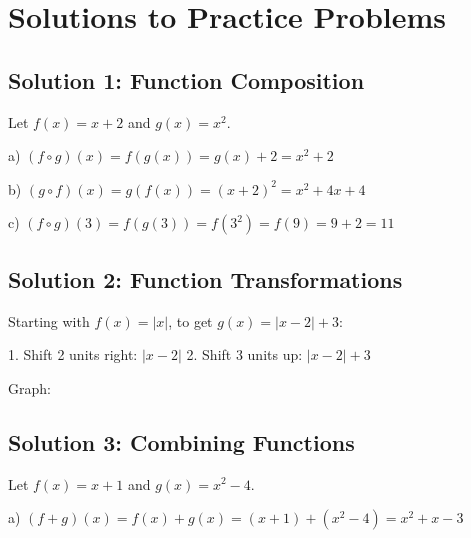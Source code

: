 \documentclass[12pt]{article}
\begin{document}
\newpage

\section{Solutions to Practice Problems}

\subsection{Solution 1: Function Composition}

Let $f(x) = x + 2$ and $g(x) = x^2$.

a) $(f \circ g)(x) = f(g(x)) = g(x) + 2 = x^2 + 2$

b) $(g \circ f)(x) = g(f(x)) = (x + 2)^2 = x^2 + 4x + 4$

c) $(f \circ g)(3) = f(g(3)) = f(3^2) = f(9) = 9 + 2 = 11$

\subsection{Solution 2: Function Transformations}

Starting with $f(x) = |x|$, to get $g(x) = |x - 2| + 3$:

1. Shift 2 units right: $|x - 2|$
2. Shift 3 units up: $|x - 2| + 3$

Graph:

\begin{center}
\end{center}

\subsection{Solution 3: Combining Functions}

Let $f(x) = x + 1$ and $g(x) = x^2 - 4$.

a) $(f + g)(x) = f(x) + g(x) = (x + 1) + (x^2 - 4) = x^2 + x - 3$
\end{document}
